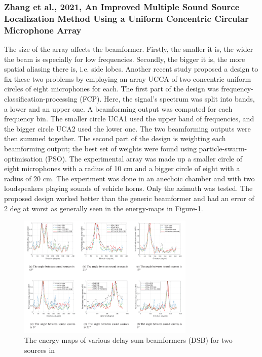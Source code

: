 \documentclass{report}
\begin{document}
\subsubsection{Zhang et al., 2021, An Improved Multiple Sound Source Localization Method Using a Uniform Concentric Circular Microphone Array}

The size of the array affects the beamformer. Firstly, the smaller it is, the wider the beam is especially for low frequencies. Secondly, the bigger it is, the more spatial aliasing there is, i.e. side lobes. Another recent study \cite{zhang_improved_2021} proposed a design to fix these two problems by employing an array UCCA of two concentric uniform circles of eight microphones for each. The first part of the design was frequency-classification-processing (FCP). Here, the signal's spectrum was split into bands, a lower and an upper one. A beamforming output was computed for each frequency bin. The smaller circle UCA1 used the upper band of frequencies, and the bigger circle UCA2 used the lower one. The two beamforming outputs were then summed together. The second part of the design is weighting each beamforming output; the best set of weights were found using particle-swarm-optimisation (PSO). The experimental array was made up a smaller circle of eight microphones with a radius of 10 \si{cm} and a bigger circle of eight with a radius of 20 \si{cm}. The experiment was done in an anechoic chamber and with two loudspeakers playing sounds of vehicle horns. Only the azimuth was tested. The proposed design worked better than the generic beamformer and had an error of 2 \si{deg} at worst as generally seen in the energy-maps in Figure-\ref{fig:zhang_2021_maps}.

\begin{figure}[H]
\includegraphics[width=0.75\textwidth]{./zhang_2021/maps.png}
\centering
\caption{The energy-maps of various delay-sum-beamformers (DSB) for two sources in \cite{zhang_improved_2021}}
\label{fig:zhang_2021_maps}
\centering
\end{figure}
\end{document}
